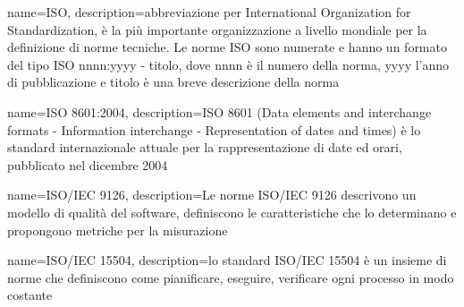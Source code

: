 {
	name=ISO,
	description={abbreviazione per International Organization for Standardization, è la più importante organizzazione a livello mondiale per la definizione di norme tecniche. Le norme ISO sono numerate e hanno un formato del tipo ISO nnnn:yyyy - titolo, dove nnnn è il numero della norma, yyyy l'anno di pubblicazione e titolo è una breve descrizione della norma}
}

{
	name=ISO 8601:2004,
	description={ISO 8601 (Data elements and interchange formats - Information interchange - Representation of dates and times) è lo standard internazionale attuale per la rappresentazione di date ed orari, pubblicato nel dicembre 2004}
}

{
	name=ISO/IEC 9126,
	description={Le norme ISO/IEC 9126 descrivono un modello di qualità del software, definiscono le caratteristiche che lo determinano e propongono metriche per la misurazione}
}

{
	name=ISO/IEC 15504,
	description={lo standard ISO/IEC 15504 è un insieme di norme che definiscono come pianificare, eseguire, verificare ogni processo in modo costante}
}